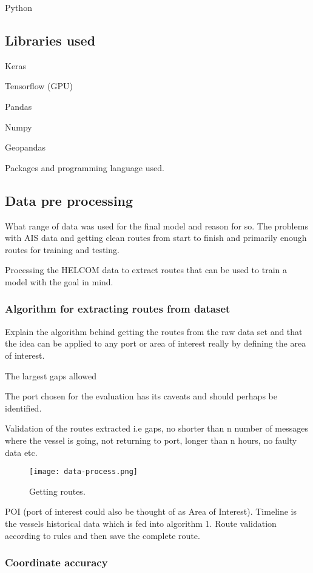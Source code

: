 \documentclass[../main.tex]{subfiles}
\begin{document}
Python
\subsection{Libraries used}

Keras

Tensorflow (GPU)

Pandas

Numpy

Geopandas

Packages and programming language used.


\subsection{Data pre processing}

What range of data was used for the final model and reason for so. The problems with AIS data and getting clean routes from start to finish and primarily enough routes for training and testing. 

Processing the HELCOM data to extract routes that can be used to train a model with the goal in mind.


\subsubsection{Algorithm for extracting routes from dataset}

Explain the algorithm behind getting the routes from the raw data set and that the idea can be applied to any port or area of interest really by defining the area of interest.

The largest gaps allowed

The port chosen for the evaluation has its caveats and should perhaps be identified.

Validation of the routes extracted i.e gaps, no shorter than n number of messages where the vessel is going, not returning to port, longer than n hours, no faulty data etc.

\begin{figure}[H]
	\centering
	\texttt{[image: data-process.png]}
	\caption{Getting routes.}
	\label{fig:flowchart}
\end{figure}

POI (port of interest could also be thought of as Area of Interest). Timeline is the vessels historical data which is fed into algorithm 1. Route validation according to rules and then save the complete route.

\subsubsection{Coordinate accuracy}
\end{document}
